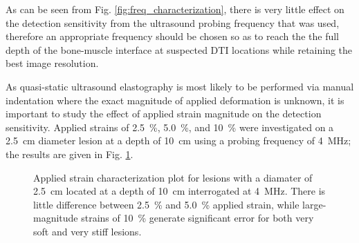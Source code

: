 			As can be seen from Fig. \ref{fig:freq_characterization}, there is very little effect on the detection sensitivity from the ultrasound probing frequency that was used, therefore an appropriate frequency should be chosen so as to reach the the full depth of the bone-muscle interface at suspected DTI locations while retaining the best image resolution.

			As quasi-static ultrasound elastography is most likely to be performed via manual indentation where the exact magnitude of applied deformation is unknown, it is important to study the effect of applied strain magnitude on the detection sensitivity. Applied strains of \SI{2.5}{\percent}, \SI{5.0}{\percent}, and \SI{10}{\percent} were investigated on a \SI{2.5}{\cm} diameter lesion at a depth of \SI{10}{\cm} using a probing frequency of \SI{4}{\MHz}; the results are given in Fig. \ref{fig:strain_characterization}.

			\begin{figure}[!t]
				\centering
				\caption[Quasi-static applied strain characterization]{Applied strain characterization plot for lesions with a diamater of \SI{2.5}{\cm} located at a depth of \SI{10}{\cm} interrogated at \SI{4}{\MHz}. There is little difference between \SI{2.5}{\percent} and \SI{5.0}{\percent} applied strain, while large-magnitude strains of \SI{10}{\percent} generate significant error for both very soft and very stiff lesions.}
				\label{fig:strain_characterization}
			\end{figure}

